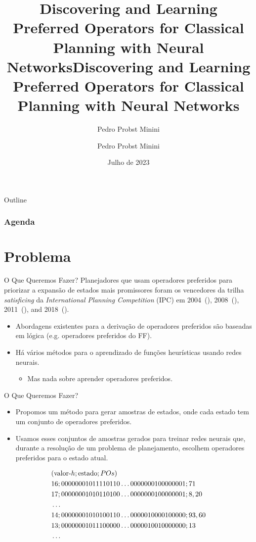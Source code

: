 \documentclass{beamer}
\title[Discovering and Learning Preferred Operators]{Discovering and Learning Preferred Operators for Classical Planning with Neural Networks}
\author{Pedro Probst Minini}
\title[Discovering and Learning Preferred Operators]
      {Discovering and Learning Preferred Operators for Classical Planning with Neural Networks}
\date{Julho de 2023}
\author{Pedro Probst Minini}
\institute{Instituto de Informática --- UFRGS}
\begin{document}

\begin{frame}[plain]
  \titlepage
\end{frame}

\begin{frame}{Outline}
  \frametitle{Agenda}
  \tableofcontents
\end{frame}

\section{Problema}
\begin{frame}{O Que Queremos Fazer?}
Planejadores que usam operadores preferidos para \alert{priorizar a expansão de estados mais promissores} foram os vencedores da trilha \emph{satisficing} da \emph{International Planning Competition} (IPC) em \alert{2004}~(\cite{Helmert/2006}), \alert{2008}~(\cite{Richter.lama.etal/2010}), \alert{2011}~(\cite{Richter.lama.etal/2011}), and \alert{2018}~(\cite{Seipp-fast.etal/2018}).

\pause
\begin{itemize}
  \item Abordagens existentes para a derivação de operadores preferidos são baseadas em lógica (e.g. operadores preferidos do FF).
  \pause
  \item Há vários métodos para o aprendizado de funções heurísticas usando redes neurais.
  \begin{itemize}
    \item Mas nada sobre aprender operadores preferidos.
  \end{itemize}
\end{itemize}
\end{frame}

\begin{frame}{O Que Queremos Fazer?}
\begin{itemize}
  \item Propomos um método para gerar amostras de estados, onde \alert{cada estado tem um conjunto de operadores preferidos}.
  \pause
  \item Usamos esses conjuntos de amostras gerados para \alert{treinar redes neurais} que, durante a resolução de um problema de planejamento, escolhem operadores preferidos para o estado atual.
\end{itemize}
\pause
\begin{align*}
\centering
&(\text{valor-}h;\text{estado};POs) \\
&16;00000001011110110\ldots0000000100000001;71 \\
&17;00000001010110100\ldots0000000100000001;8,20 \\
&\ldots \\
&14;00000001010100110\ldots0000010000100000;93,60 \\
&13;00000001011100000\ldots0000010010000000;13 \\
&\ldots
\end{align*}
\end{frame}
\end{document}
